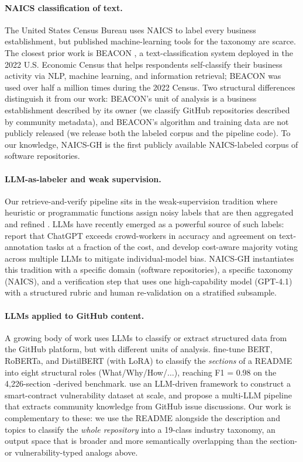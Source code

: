 \documentclass{article}
\begin{document}
\paragraph{NAICS classification of text.}
The United States Census Bureau uses NAICS to label every business
establishment, but published machine-learning tools for the
taxonomy are scarce. The closest prior work is BEACON
\citep{dumbacher2025beacon}, a text-classification system deployed in
the 2022 U.S. Economic Census that helps respondents self-classify
their business activity via NLP, machine learning, and information
retrieval; BEACON was used over half a million times during the 2022
Census. Two structural differences distinguish it from our work:
BEACON's unit of analysis is a business establishment described by
its owner (we classify GitHub repositories described by community
metadata), and BEACON's algorithm and training data are not publicly
released (we release both the labeled corpus and the pipeline code).
To our knowledge, NAICS-GH is the first publicly available
NAICS-labeled corpus of software repositories.

\paragraph{LLM-as-labeler and weak supervision.}
Our retrieve-and-verify pipeline sits in the weak-supervision
tradition where heuristic or programmatic functions assign noisy
labels that are then aggregated and refined
\citep{ratner2016dataprogramming,ratner2017snorkel}. LLMs have
recently emerged as a powerful source of such labels:
\citet{gilardi2023chatgpt} report that ChatGPT exceeds crowd-workers
in accuracy and agreement on text-annotation tasks at a fraction of
the cost, and \citet{elumar2025cost} develop cost-aware majority
voting across multiple LLMs to mitigate individual-model bias.
NAICS-GH instantiates this tradition with a specific domain
(software repositories), a specific taxonomy (NAICS), and a
verification step that uses one high-capability model (GPT-4.1) with
a structured rubric and human re-validation on a stratified
subsample.

\paragraph{LLMs applied to GitHub content.}
A growing body of work uses LLMs to classify or extract structured
data from the GitHub platform, but with different units of analysis.
\citet{mehmood2025llm} fine-tune BERT, RoBERTa, and DistilBERT (with
LoRA) to classify the \emph{sections} of a README into eight
structural roles (What/Why/How/$\ldots$), reaching F1 = 0.98 on the
4{,}226-section \citet{zanartu2022categorizing}-derived benchmark.
\citet{chen2025forge} use an LLM-driven framework to construct a
smart-contract vulnerability dataset at scale, and
\citet{joynab2026threads} propose a multi-LLM pipeline that extracts
community knowledge from GitHub issue discussions. Our work is
complementary to these: we use the README alongside the description
and topics to classify the \emph{whole repository} into a 19-class
industry taxonomy, an output space that is broader and more
semantically overlapping than the section- or vulnerability-typed
analogs above.
\end{document}
